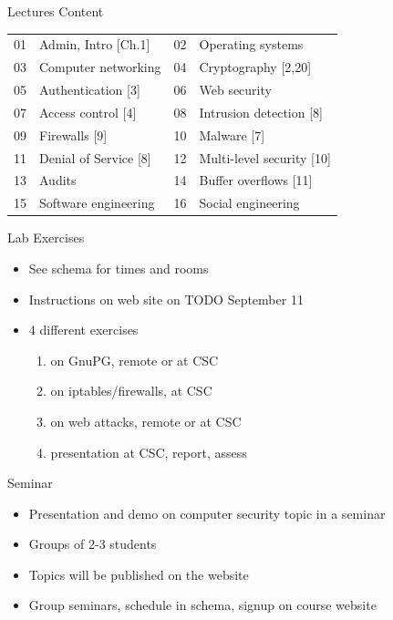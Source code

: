 \documentclass{beamer}
\newcommand{\todo}[1]{\alert{TODO #1}}
\begin{document}
\begin{frame}{Lectures Content}
  \begin{tabular}{cl|cl}
    01 & Admin, Intro [Ch.1] &
    02 & Operating systems \\
    03 & Computer networking &
    04 & Cryptography [2,20] \\
    05 & Authentication [3] &
    06 & Web security \\
    07 & Access control [4] &
    08 & Intrusion detection [8] \\
    09 & Firewalls [9] &
    10 & Malware [7] \\
    11 & Denial of Service [8] &
    12 & Multi-level security [10] \\
    13 & Audits &
    14 & Buffer overflows [11] \\
    15 & Software engineering &
    16 & Social engineering
  \end{tabular}
\end{frame}

\begin{frame}{Lab Exercises}
  \begin{itemize}
    \item See schema for times and rooms
    \item Instructions on web site on \todo{September 11}
    \item 4 different exercises
      \begin{enumerate}
        \item on GnuPG, remote or at CSC
        \item on iptables/firewalls, at CSC
        \item on web attacks, remote or at CSC
        \item presentation at CSC, report, assess
      \end{enumerate}
  \end{itemize}
\end{frame}

\begin{frame}{Seminar}
  \begin{itemize}
    \item Presentation and demo on computer security 
      topic in a seminar
    \item Groups of 2-3 students
    \item Topics will be published on the website
    \item Group seminars, schedule in schema, 
      signup on course website
  \end{itemize}
\end{frame}
\end{document}
